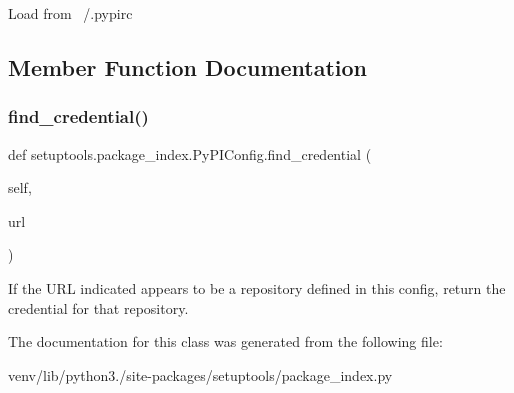 \begin{DoxyVerb}Load from ~/.pypirc
\end{DoxyVerb}
 

\subsection{Member Function Documentation}
\mbox{\label{classsetuptools_1_1package__index_1_1_py_p_i_config_a591eed255577ae924d683a1cdfc6cbbd}} 
\subsubsection{\texorpdfstring{find\+\_\+credential()}{find\_credential()}}
{\footnotesize\ttfamily def setuptools.\+package\+\_\+index.\+Py\+P\+I\+Config.\+find\+\_\+credential (\begin{DoxyParamCaption}\item[{}]{self,  }\item[{}]{url }\end{DoxyParamCaption})}

\begin{DoxyVerb}If the URL indicated appears to be a repository defined in this
config, return the credential for that repository.
\end{DoxyVerb}
 

The documentation for this class was generated from the following file\+:\begin{DoxyCompactItemize}
\item 
venv/lib/python3./site-\/packages/setuptools/package\+\_\+index.\+py\end{DoxyCompactItemize}
